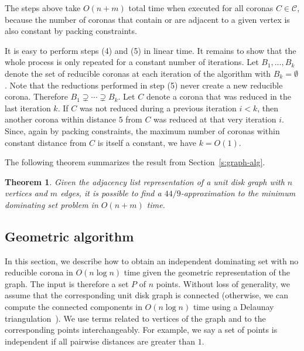 \documentclass[preprint,12pt]{elsarticle}
\newtheorem{thm}{Theorem}
\newcommand{\CC}{\mathcal{C}}
\begin{document}
The steps above take $O(n+m)$ total time when executed for all coronas $C \in \CC$, because the number of coronas that contain or are adjacent to a given vertex is also constant by packing constraints.

It is easy to perform steps (4) and (5) in linear time. It remains to show that the whole process is only repeated for a constant number of iterations. Let $B_1, \ldots, B_k$ denote the set of reducible coronas at each iteration of the algorithm with $B_k = \emptyset$. Note that the reductions performed in step (5) never create a new reducible corona. Therefore $B_1 \supsetneq \cdots \supsetneq B_k$. Let $C$ denote a corona that was reduced in the last iteration $k$. If $C$ was not reduced during a previous iteration $i < k$, then another corona within distance $5$ from $C$ was reduced at that very iteration $i$. Since, again by packing constraints, the maximum number of coronas within constant distance from $C$ is itself a constant, we have $k = O(1)$.

The following theorem summarizes the result from Section~\ref{s:graph-alg}.

\begin{thm} \label{thm:graph-alg}
Given the adjacency list representation of a unit disk graph with $n$ vertices and $m$ edges, it is possible to find a $44/9$-approximation to the minimum dominating set problem in $O(n + m)$ time.
\end{thm}


\subsection{Geometric algorithm} \label{s:geo-alg}

In this section, we describe how to obtain an independent dominating set with no reducible corona in $O(n \log n)$ time given the geometric representation of the graph. The input is therefore a set $P$ of $n$ points. Without loss of generality, we assume that the corresponding unit disk graph is connected (otherwise, we can compute the connected components in $O(n \log n)$ time using a Delaunay triangulation~\cite{cg}). We use terms related to vertices of the graph and to the corresponding points interchangeably. For example, we say a set of points is independent if all pairwise distances are greater than $1$.
\end{document}
